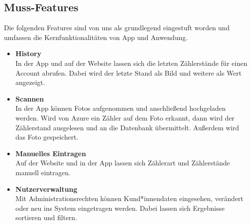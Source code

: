\subsection{Muss-Features}
Die folgenden Features sind von uns als grundlegend eingestuft worden und umfassen die Kernfunktionalitäten von App und Anwendung.
\begin{itemize}
\item \textbf{History} \hfill \\
	In der App und auf der Website lassen sich die letzten Zählerstände für einen Account abrufen.
	Dabei wird der letzte Stand als Bild und weitere als Wert angezeigt.
\item \textbf{Scannen} \hfill \\
	In der App können Fotos aufgenommen und anschließend hochgeladen werden. 
	Wird von Azure ein Zähler auf dem Foto erkannt, dann wird der Zählerstand ausgelesen und an die Datenbank übermittelt.
	Außerdem wird das Foto gespeichert.
\item \textbf{Manuelles Eintragen} \hfill \\
	Auf der Website und in der App lassen sich Zählerart und Zählerstände manuell eintragen.
\item \textbf{Nutzerverwaltung} \hfill \\
	Mit Administrationsrechten können Kund*innendaten eingesehen, verändert oder neu ins System eingetragen werden.
	Dabei lassen sich Ergebnisse sortieren und filtern.
\end{itemize}

